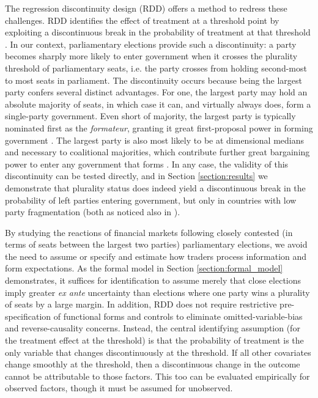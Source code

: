 \documentclass[12pt]{article}
\begin{document}
The regression discontinuity design (RDD) offers a method to redress these challenges. RDD identifies the effect of treatment at a threshold point by exploiting a discontinuous break in the probability of treatment at that threshold \citep{Hahn2001, Imbens2008, Calonico2014}. In our context, parliamentary elections provide such a discontinuity: a party becomes sharply more likely to enter government when it crosses the plurality threshold of parliamentary seats, i.e. the party crosses from holding second-most to most seats in parliament. The discontinuity occurs because being the largest party confers several distinct advantages. For one, the largest party may hold an absolute majority of seats, in which case it can, and virtually always does, form a single-party government. Even short of majority, the largest party is typically nominated first as the \textit{formateur}, granting it great first-proposal power in forming government \citep{Baron1989}. The largest party is also most likely to be at dimensional medians and necessary to coalitional majorities, which contribute further great bargaining power to enter any government that forms \citep{laver1996making}. In any case, the validity of this discontinuity can be tested directly, and in Section \ref{section:results} we demonstrate that plurality status does indeed yield a discontinuous break in the probability of left parties entering government, but only in countries with low party fragmentation (both as noticed also in \cite{powell2000elections}). 


By studying the reactions of financial markets following closely contested (in terms of seats between the largest two parties) parliamentary elections, we avoid the need to assume or specify and estimate how traders process information and form expectations. As the formal model in Section \ref{section:formal_model} demonstrates, it suffices for identification to assume merely that close elections imply greater \textit{ex ante} uncertainty than elections where one party wins a plurality of seats by a large margin. In addition, RDD does not require restrictive pre-specification of functional forms and controls to eliminate omitted-variable-bias and reverse-causality concerns. Instead, the central identifying assumption (for the treatment effect at the threshold) is that the probability of treatment is the only variable that changes discontinuously at the threshold. If all other covariates change smoothly at the threshold, then a discontinuous change in the outcome cannot be attributable to those factors. This too can be evaluated empirically for observed factors, though it must be assumed for unobserved.
\end{document}
